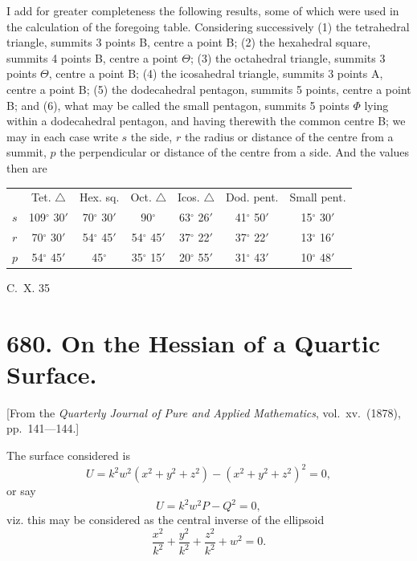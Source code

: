 \documentclass[11pt,a4paper]{book}
\begin{document}
I add for greater completeness the following results, some of which were used in the calculation of the foregoing table. Considering successively (1) the tetrahedral triangle, summits 3 points B, centre a point B; (2) the hexahedral square, summits 4 points B, centre a point $\Theta$; (3) the octahedral triangle, summits 3 points $\Theta$, centre a point B; (4) the icosahedral triangle, summits 3 points A, centre a point B; (5) the dodecahedral pentagon, summits 5 points, centre a point B; and (6), what may be called the small pentagon, summits 5 points $\Phi$ lying within a dodecahedral pentagon, and having therewith the common centre B; we may in each case write $s$ the side, $r$ the radius or distance of the centre from a summit, $p$ the perpendicular or distance of the centre from a side. And the values then are

\begin{center}
\begin{tabular}{lcccccc}
 & Tet. $\triangle$ & Hex. sq. & Oct. $\triangle$ & Icos. $\triangle$ & Dod. pent. & Small pent. \\
$s$ & 109$^\circ$ 30$'$ & 70$^\circ$ 30$'$ & 90$^\circ$ & 63$^\circ$ 26$'$ & 41$^\circ$ 50$'$ & 15$^\circ$ 30$'$ \\
$r$ & 70$^\circ$ 30$'$ & 54$^\circ$ 45$'$ & 54$^\circ$ 45$'$ & 37$^\circ$ 22$'$ & 37$^\circ$ 22$'$ & 13$^\circ$ 16$'$ \\
$p$ & 54$^\circ$ 45$'$ & 45$^\circ$ & 35$^\circ$ 15$'$ & 20$^\circ$ 55$'$ & 31$^\circ$ 43$'$ & 10$^\circ$ 48$'$
\end{tabular}
\end{center}
\hfill C.~X. 35

\newpage

\section*{680. On the Hessian of a Quartic Surface.}

[From the \textit{Quarterly Journal of Pure and Applied Mathematics}, vol.\ xv.\ (1878), pp.\ 141---144.]

The surface considered is
\[
U = k^2 w^2 (x^2 + y^2 + z^2) - (x^2 + y^2 + z^2)^2 = 0,
\]
or say
\[
U = k^2 w^2 P - Q^2 = 0,
\]
viz. this may be considered as the central inverse of the ellipsoid
\[
\frac{x^2}{k^2} + \frac{y^2}{k^2} + \frac{z^2}{k^2} + w^2 = 0.
\]
\end{document}
